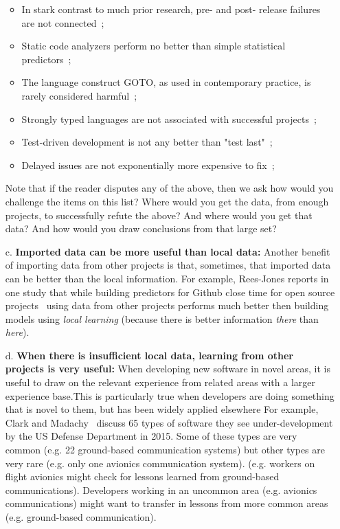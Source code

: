 \documentclass[sigconf]{acmart}
\newcommand{\bi}{\begin{itemize}[leftmargin=0.4cm]}
\newcommand{\ei}{\end{itemize}}
\theoremstyle{break}
\begin{document}
\begin{enumerate}
\bi

    \item In stark contrast to  much prior research, pre- and post- release failures are not connected~\cite{fenton2000quantitative};
    
    \item Static code analyzers perform no better than simple statistical predictors~\cite{Fa13}; 
    
    \item The language construct GOTO, as used in contemporary practice, is rarely considered harmful~\cite{nagappan2015empirical};
    
    \item Strongly typed languages are not associated with successful projects~\cite{ray2014large};  
    
    \item Test-driven development is not any better than "test last"~\cite{fucci2017dissection};
    
    \item Delayed issues are not exponentially more expensive to fix~\cite{menzies2017delayed};

\ei

Note that if the reader disputes any of the above, then we ask how would you challenge the items on this list? Where would you get the data, from enough projects, to   successfully refute the above? And where would you get that data? And how would you draw conclusions from that large set?

\item[c.]  \textbf{Imported data can be more useful than local data:} Another benefit of  importing data from other projects is that, sometimes, that imported data can be better than the local information. For example, Rees-Jones reports in one study that while building predictors
for Github close time  for open source projects~\cite{rees2017better} using data from other projects performs much better then building models using {\em local learning} (because there is better  information {\em there} than {\em here}).


\item[d.]  \textbf{When there is insufficient local data, learning from other projects is very useful:} When developing new software in  novel areas, it is useful to draw on the relevant  experience  from related areas with a larger experience base.This is particularly true when developers are doing something that is novel to them, but has been widely applied elsewhere
For example, Clark and Madachy~\cite{clark15} discuss 65 types of software they see        under-development by the US Defense Department in 2015.   Some of these types are very common (e.g. 22 ground-based communication systems) but other types are very rare (e.g. only  one avionics communication system). (e.g. workers on   flight avionics   might check for lessons learned from ground-based communications). Developers  working in an uncommon area (e.g. avionics communications) might want to transfer in lessons from more common areas (e.g. ground-based communication).

\end{enumerate}
\end{document}
